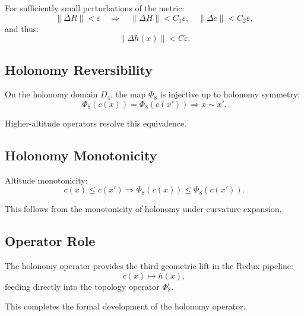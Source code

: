 For sufficiently small perturbations of the metric:
\[
\| \Delta R \| < \varepsilon
\quad\Longrightarrow\quad
\| \Delta H \| < C_1 \varepsilon,
\quad
\| \Delta c \| < C_2 \varepsilon,
\]
and thus:
\[
\| \Delta h(x) \| < C \varepsilon.
\]

\subsection{Holonomy Reversibility}

On the holonomy domain $D_4$, the map $\Phi_8$ is injective up to holonomy
symmetry:
\[
\Phi_8(c(x)) = \Phi_8(c(x')) \Rightarrow x \sim x'.
\]

Higher-altitude operators resolve this equivalence.

\subsection{Holonomy Monotonicity}

Altitude monotonicity:
\[
c(x) \le c(x') \Rightarrow \Phi_8(c(x)) \le \Phi_8(c(x')).
\]

This follows from the monotonicity of holonomy under curvature expansion.

\subsection{Operator Role}

The holonomy operator provides the third geometric lift in the Redux pipeline:
\[
c(x) \mapsto h(x),
\]
feeding directly into the topology operator $\Phi_8^t$.

This completes the formal development of the holonomy operator.

